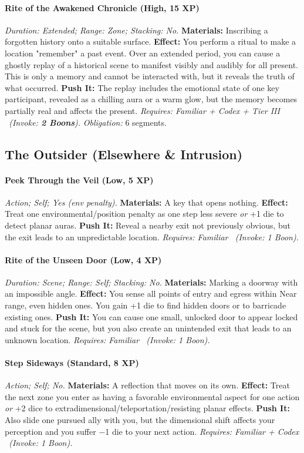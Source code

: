 \documentclass[12pt,twoside]{book}
\begin{document}
\paragraph{Rite of the Awakened Chronicle (High, 15 XP)} \emph{Duration: Extended; Range: Zone; Stacking: No.}
\textbf{Materials:} Inscribing a forgotten history onto a suitable surface.
\textbf{Effect:} You perform a ritual to make a location "remember" a past event. Over an extended period, you can cause a ghostly replay of a historical scene to manifest visibly and audibly for all present. This is only a memory and cannot be interacted with, but it reveals the truth of what occurred.
\textbf{Push It:} The replay includes the emotional state of one key participant, revealed as a chilling aura or a warm glow, but the memory becomes partially real and affects the present.
\emph{Requires: Familiar + Codex + Tier III \ (\textit{Invoke:} \textbf{2 Boons}).}
\emph{Obligation:} 6 segments.

\subsection{The Outsider (Elsewhere \& Intrusion)}
\paragraph{Peek Through the Veil (Low, 5 XP)} \emph{Action; Self; Yes (env penalty).}
\textbf{Materials:} A key that opens nothing.
\textbf{Effect:} Treat one environmental/position penalty as one step less severe \emph{or} +1 die to detect planar auras.
\textbf{Push It:} Reveal a nearby exit not previously obvious, but the exit leads to an unpredictable location.
\emph{Requires: Familiar \ (\textit{Invoke:} 1 Boon).}
\paragraph{Rite of the Unseen Door (Low, 4 XP)} \emph{Duration: Scene; Range: Self; Stacking: No.}
\textbf{Materials:} Marking a doorway with an impossible angle.
\textbf{Effect:} You sense all points of entry and egress within Near range, even hidden ones. You gain +1 die to find hidden doors or to barricade existing ones.
\textbf{Push It:} You can cause one small, unlocked door to appear locked and stuck for the scene, but you also create an unintended exit that leads to an unknown location.
\emph{Requires: Familiar \ (\textit{Invoke:} 1 Boon).}
\paragraph{Step Sideways (Standard, 8 XP)} \emph{Action; Self; No.}
\textbf{Materials:} A reflection that moves on its own.
\textbf{Effect:} Treat the next zone you enter as having a favorable environmental aspect for one action \emph{or} +2 dice to extradimensional/teleportation/resisting planar effects.
\textbf{Push It:} Also slide one pursued ally with you, but the dimensional shift affects your perception and you suffer −1 die to your next action.
\emph{Requires: Familiar + Codex \ (\textit{Invoke:} 1 Boon).}
\end{document}
